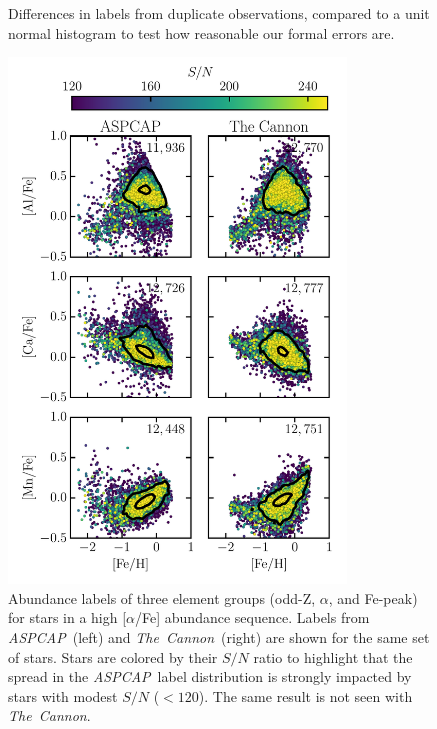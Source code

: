 \documentclass[12pt,preprint]{aastex}
\newcommand{\project}[1]{\textsl{#1}}
\newcommand{\TheCannon}{\project{The~Cannon}}
\newcommand{\acronym}[1]{{\small{#1}}}
\newcommand{\aspcap}{\project{\acronym{ASPCAP}}}
\begin{document}
\begin{figure}[p]
\centering
\caption{Differences in labels from duplicate observations, compared to a unit normal histogram to test how reasonable our formal errors are.
\label{fig:duplicate-observations}}
\end{figure}





\begin{figure}[p]
\centering
\includegraphics[width=0.8\textwidth]{high-alpha-sequence.pdf}
\caption{Abundance labels of three element groups (odd-Z, $\alpha$, and Fe-peak) for stars in a high [$\alpha$/Fe] abundance sequence. Labels from \aspcap\ (left) and \TheCannon\ (right) are shown for the same set of stars. Stars are colored by their $S/N$ ratio to highlight that the spread in the \aspcap\ label distribution is strongly impacted by stars with modest $S/N$ ($<120$). The same result is not seen with \TheCannon.\label{fig:high-alpha-sequence}}
\end{figure}
\end{document}
